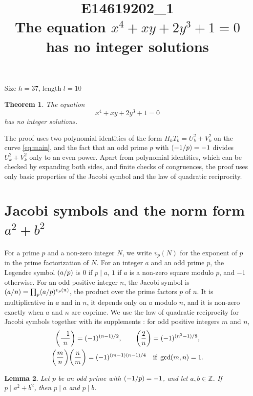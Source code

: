 \documentclass[11pt]{article}
\title{\textbf{E14619202\_1}\\[4pt] {\Large The equation $x^{4}+xy+2y^{3}+1=0$ has no integer solutions}}
\author{}
\date{}
\newtheorem{theorem}{Theorem}
\newtheorem{lemma}[theorem]{Lemma}
\newcommand{\Z}{\mathbb{Z}}
\newcommand{\leg}[2]{\mathchoice{\biggl(\dfrac{#1}{#2}\biggr)}{(#1/#2)}{(#1/#2)}{(#1/#2)}}
\begin{document}
\maketitle
\vspace{-8ex}
\begin{center}
Size $h=37$, length $l=10$
\end{center}

\begin{theorem}\label{thm:main}
The equation
\begin{equation}\label{eq:main}
x^{4}+xy+2y^{3}+1=0
\end{equation}
has no integer solutions.
\end{theorem}

The proof uses two polynomial identities of the form $H_kT_k=U_k^2+V_k^2$ on the curve \eqref{eq:main}, and the fact that an odd prime $p$ with $\leg{-1}{p}=-1$ divides $U_k^2+V_k^2$ only to an even power. Apart from polynomial identities, which can be checked by expanding both sides, and finite checks of congruences, the proof uses only basic properties of the Jacobi symbol and the law of quadratic reciprocity.

\section{\texorpdfstring{Jacobi symbols and the norm form $a^2+b^2$}{Jacobi symbols and the norm form}}

For a prime $p$ and a non-zero integer $N$, we write $v_p(N)$ for the exponent of $p$ in the prime factorization of $N$. For an integer $a$ and an odd prime $p$, the Legendre symbol $\leg{a}{p}$ is $0$ if $p\mid a$, $1$ if $a$ is a non-zero square modulo $p$, and $-1$ otherwise. For an odd positive integer $n$, the Jacobi symbol is $\leg{a}{n}=\prod_p\leg{a}{p}^{v_p(n)}$, the product over the prime factors $p$ of $n$. It is multiplicative in $a$ and in $n$, it depends only on $a$ modulo $n$, and it is non-zero exactly when $a$ and $n$ are coprime. We use the law of quadratic reciprocity for Jacobi symbols together with its supplements \cite[Chapter~5, \S2]{IR}: for odd positive integers $m$ and $n$,
\begin{gather*}
\leg{-1}{n}=(-1)^{(n-1)/2},\qquad\leg{2}{n}=(-1)^{(n^2-1)/8},\\
\leg{m}{n}\leg{n}{m}=(-1)^{(m-1)(n-1)/4}\quad\text{if }\gcd(m,n)=1.
\end{gather*}

\begin{lemma}\label{lem:divides}
Let $p$ be an odd prime with $\leg{-1}{p}=-1$, and let $a,b\in\Z$. If $p\mid a^2+b^2$, then $p\mid a$ and $p\mid b$.
\end{lemma}
\end{document}
